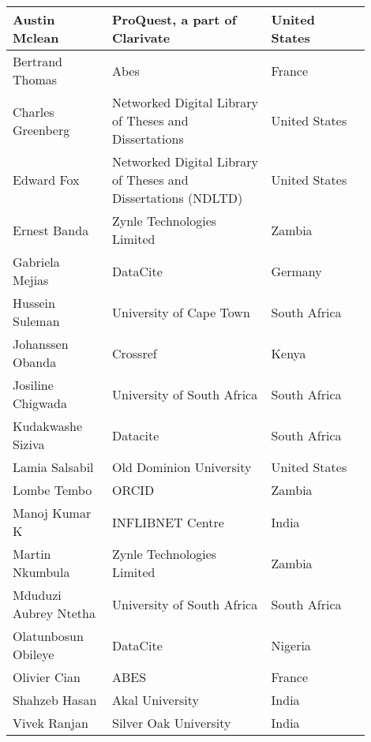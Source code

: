 
\begin{center}
\begin{longtable}{p{0.25\linewidth} p{0.4\linewidth} p{0.25\linewidth}}
\hline
Austin Mclean & ProQuest, a part of Clarivate & United States \\  \hline
Bertrand Thomas & Abes & France \\  \hline
Charles Greenberg & Networked Digital Library of Theses and Dissertations & United States \\  \hline
Edward Fox & Networked Digital Library of Theses and Dissertations (NDLTD) & United States \\  \hline
Ernest Banda & Zynle Technologies Limited & Zambia \\  \hline
Gabriela Mejias & DataCite & Germany \\  \hline
Hussein Suleman & University of Cape Town & South Africa \\  \hline
Johanssen Obanda & Crossref & Kenya \\  \hline
Josiline Chigwada & University of South Africa & South Africa \\  \hline
Kudakwashe Siziva & Datacite & South Africa \\  \hline
Lamia Salsabil & Old Dominion University & United States \\  \hline
Lombe Tembo & ORCID & Zambia \\  \hline
Manoj Kumar K & INFLIBNET Centre & India \\  \hline
Martin Nkumbula & Zynle Technologies Limited & Zambia \\  \hline
Mduduzi Aubrey Ntetha & University of South Africa & South Africa \\  \hline
Olatunbosun Obileye & DataCite & Nigeria \\  \hline
Olivier Cian & ABES & France \\  \hline
Shahzeb Hasan & Akal University & India \\  \hline
Vivek Ranjan & Silver Oak University & India \\  \hline
\end{longtable}
\end{center}
